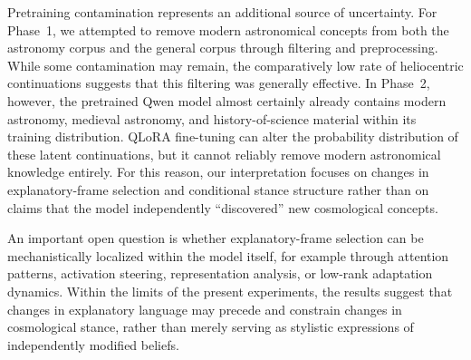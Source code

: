 Pretraining contamination represents an additional source of uncertainty. For Phase~1, we attempted to remove modern astronomical concepts from both the astronomy corpus and the general corpus through filtering and preprocessing. While some contamination may remain, the comparatively low rate of heliocentric continuations suggests that this filtering was generally effective. In Phase~2, however, the pretrained Qwen model almost certainly already contains modern astronomy, medieval astronomy, and history-of-science material within its training distribution. QLoRA fine-tuning can alter the probability distribution of these latent continuations, but it cannot reliably remove modern astronomical knowledge entirely. For this reason, our interpretation focuses on changes in explanatory-frame selection and conditional stance structure rather than on claims that the model independently ``discovered'' new cosmological concepts.

An important open question is whether explanatory-frame selection can be mechanistically localized within the model itself, for example through attention patterns, activation steering, representation analysis, or low-rank adaptation dynamics. Within the limits of the present experiments, the results suggest that changes in explanatory language may precede and constrain changes in cosmological stance, rather than merely serving as stylistic expressions of independently modified beliefs.
